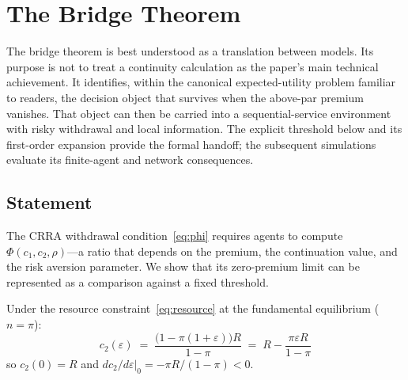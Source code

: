 \documentclass[12pt]{article}\usepackage[]{graphicx}\usepackage[]{xcolor}
\begin{document}
\section{The Bridge Theorem}
\label{sec:bridge}

The bridge theorem is best understood as a translation between models.
Its purpose is not to treat a continuity calculation as the paper's main technical achievement.
It identifies, within the canonical expected-utility problem familiar to readers, the decision object that survives when the above-par premium vanishes.
That object can then be carried into a sequential-service environment with risky withdrawal and local information.
The explicit threshold below and its first-order expansion provide the formal handoff; the subsequent simulations evaluate its finite-agent and network consequences.

\subsection{Statement}

The CRRA withdrawal condition~\eqref{eq:phi} requires agents to compute $\Phi(c_1, c_2, \rho)$---a ratio that depends on the premium, the continuation value, and the risk aversion parameter.
We show that its zero-premium limit can be represented as a comparison against a fixed threshold.

Under the resource constraint~\eqref{eq:resource} at the fundamental equilibrium ($n = \pi$):
%
\begin{equation}
  c_2(\varepsilon) \;=\;
  \frac{\bigl(1 - \pi(1+\varepsilon)\bigr)R}{1-\pi}
  \;=\; R - \frac{\pi\varepsilon R}{1-\pi}
  \label{eq:c2eps}
\end{equation}
%
so $c_2(0) = R$ and $dc_2/d\varepsilon\big|_0 = -\pi R/(1-\pi) < 0$.
\end{document}

